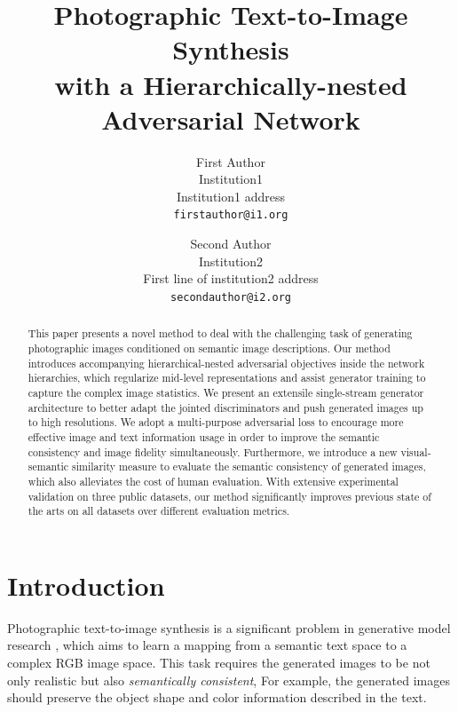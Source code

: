 \documentclass[10pt,twocolumn,letterpaper]{article}
\begin{document}
\title{Photographic Text-to-Image Synthesis \\ with a Hierarchically-nested Adversarial Network}

\author{First Author\\
Institution1\\
Institution1 address\\
{\tt\small firstauthor@i1.org}
\and
Second Author\\
Institution2\\
First line of institution2 address\\
{\tt\small secondauthor@i2.org}
}

\maketitle

\begin{abstract}
This paper presents a novel method to deal with the challenging task of generating photographic images conditioned on semantic image descriptions.
Our method introduces accompanying hierarchical-nested adversarial objectives inside the network hierarchies, which regularize mid-level representations and assist generator training to capture the complex image statistics. We present an extensile single-stream generator architecture to better adapt the jointed discriminators and push generated images up to high resolutions. We adopt a multi-purpose adversarial loss to encourage more effective image and text information usage in order to improve the semantic consistency and image fidelity simultaneously. Furthermore, we introduce a new visual-semantic similarity measure to evaluate the semantic consistency of generated images, which also alleviates the cost of human evaluation. With extensive experimental validation on three public datasets, our method significantly improves previous state of the arts on all datasets over different evaluation metrics. 


\end{abstract}


\section{Introduction}
Photographic text-to-image synthesis is a significant problem in generative model research \cite{reed2016generative}, which aims to learn a mapping from a semantic text space to a complex RGB image space. This task requires the generated images to be not only realistic but also \textit{semantically consistent}, For example, the generated images should preserve the object shape and color information described in the text.
\end{document}
